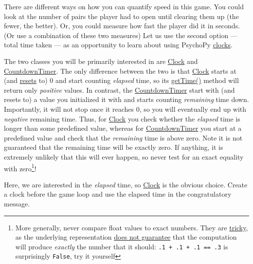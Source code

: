 \documentclass[
]{book}
\begin{document}
There are different ways on how you can quantify speed in this game. You could look at the number of pairs the player had to open until clearing them up (the fewer, the better). Or, you could measure how fast the player did it in seconds. (Or use a combination of these two measures) Let us use the second option --- total time taken --- as an opportunity to learn about using PsychoPy \href{https://psychopy.org/api/clock.html}{clocks}.

The two classes you will be primarily interested in are \href{https://psychopy.org/api/clock.html\#psychopy.clock.Clock}{Clock} and \href{https://psychopy.org/api/clock.html\#psychopy.clock.CountdownTimer}{CountdownTimer}. The only difference between the two is that \href{https://psychopy.org/api/clock.html\#psychopy.clock.Clock}{Clock} starts at (and \href{https://psychopy.org/api/clock.html\#psychopy.clock.Clock.reset}{resets} to) 0 and start counting \emph{elapsed} time, so its \href{https://psychopy.org/api/clock.html\#psychopy.clock.MonotonicClock.getTime}{getTime()} method will return only \emph{positive} values. In contrast, the \href{https://psychopy.org/api/clock.html\#psychopy.clock.CountdownTimer}{CountdownTimer} start with (and resets to) a value you initialized it with and starts counting \emph{remaining} time down. Importantly, it will not stop once it reaches 0, so you will eventually end up with \emph{negative} remaining time. Thus, for \href{https://psychopy.org/api/clock.html\#psychopy.clock.Clock}{Clock} you check whether the \emph{elapsed} time is longer than some predefined value, whereas for \href{https://psychopy.org/api/clock.html\#psychopy.clock.CountdownTimer}{CountdownTimer} you start at a predefined value and check that the \emph{remaining} time is above zero. Note it is not guaranteed that the remaining time will be exactly zero. If anything, it is extremely unlikely that this will ever happen, so never test for an exact equality with zero\footnote{More generally, never compare float values to exact numbers. They are \href{http://www.lahey.com/float.htm}{tricky}, as the underlying representation \href{https://docs.python.org/3/tutorial/floatingpoint.html}{does not guarantee} that the computation will produce \emph{exactly} the number that it should: \texttt{.1\ +\ .1\ +\ .1\ ==\ .3} is surprisingly \texttt{False}, try it yourself}!

Here, we are interested in the \emph{elapsed} time, so \href{https://psychopy.org/api/clock.html\#psychopy.clock.Clock}{Clock} is the obvious choice. Create a clock before the game loop and use the elapsed time in the congratulatory message.
\end{document}
